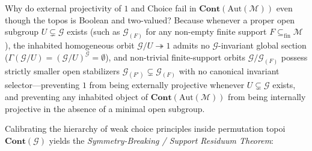 \documentclass[10pt,twoside,openright]{book}
\theoremstyle{crmplain}
\theoremstyle{crmdef}
\theoremstyle{crmremark}
\begin{document}
Why do external projectivity of $1$ and Choice fail in $\mathbf{Cont}(\mathrm{Aut}(\mathcal{M}))$ even though the topos is Boolean and two-valued? Because whenever a proper open subgroup $U \subsetneq \mathcal{G}$ exists (such as $\mathcal{G}_{(F)}$ for any non-empty finite support $F \subseteq_{\mathrm{fin}} \mathcal{M}$), the inhabited homogeneous orbit $\mathcal{G}/U \twoheadrightarrow 1$ admits no $\mathcal{G}$-invariant global section ($\Gamma(\mathcal{G}/U) = (\mathcal{G}/U)^{\mathcal{G}} = \emptyset$), and non-trivial finite-support orbits $\mathcal{G}/\mathcal{G}_{(F)}$ possess strictly smaller open stabilizers $\mathcal{G}_{(F')} \subsetneq \mathcal{G}_{(F)}$ with no canonical invariant selector---preventing $1$ from being externally projective whenever $U \subsetneq \mathcal{G}$ exists, and preventing any inhabited object of $\mathbf{Cont}(\mathrm{Aut}(\mathcal{M}))$ from being internally projective in the absence of a minimal open subgroup.

Calibrating the hierarchy of weak choice principles inside permutation topoi $\mathbf{Cont}(\mathcal{G})$ yields the \emph{Symmetry-Breaking / Support Residuum Theorem}:
\end{document}
